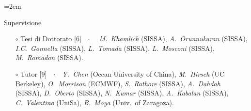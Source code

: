\documentclass[
  usegeometry%
]{scrartcl}
\newcommand{\Description}[1]{\hangindent=2em\hangafter=0\noindent\raggedright\footnotesize{#1}\par\normalsize\vspace{1em}} %
\begin{document}
\begin{cv}{}
\Description{{\color{cyan} Supervisione}
\begin{itemize}
    \item[$\circ$] {\color{BrickRed}Tesi di Dottorato} [6]\ \ $\cdotp$\ \ \textit{ M.\ Khamlich} (SISSA), \textit{A.\ Orunnukaran} (SISSA),  \textit{I.C.\ Gonnella} (SISSA), \textit{ L.\ Tomada} (SISSA), \textit{L.\ Mosconi} (SISSA),  \textit{M.\ Ramadan} (SISSA).
    \item[$\circ$] {\color{orange}Tutor} [9]\ \ $\cdotp$\ \ \textit{Y.\ Chen} (Ocean University of China), \textit{M.\ Hirsch} (UC Berkeley), \textit{O.\ Morrison} (ECMWF), \textit{S.\ Rathore} (SISSA), \textit{A.\ Dahdah} (SISSA), \textit{D.\ Oberto} (SISSA), \textit{N.\ Kumar} (SISSA), \textit{A.\ Kabalan} (SISSA), \textit{C.\ Valentino} (UniSa), \textit{B.\ Moya} (Univ.\ of Zaragoza).

\end{itemize}}
\end{cv}
\end{document}
